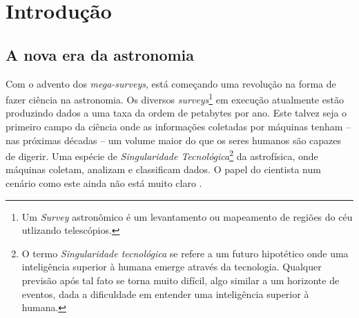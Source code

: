 


\chapter{Introdução}
\label{sec:Intro}


\section{A nova era da astronomia}
\label{sec:Intro:NovaEra}

Com o advento dos {\em mega-surveys}, está começando uma revolução na forma de
fazer ciência na astronomia. Os diversos {\em surveys}\footnote{Um {\em Survey}
astronômico é um levantamento ou mapeamento de regiões do céu utlizando
telescópios.} em execução atualmente estão produzindo dados a uma taxa da ordem
de petabytes por ano. Este talvez seja o primeiro campo da ciência onde as
informações coletadas por máquinas tenham -- nas próximas décadas -- um volume
maior do que os seres humanos são capazes de digerir. Uma espécie de {\em
Singularidade Tecnológica}\footnote{O termo {\em Singularidade tecnológica} se
refere a um futuro hipotético onde uma inteligência superior à humana emerge
através da tecnologia. Qualquer previsão após tal fato se torna muito difícil,
algo similar a um horizonte de eventos, dada a dificuldade em entender uma
inteligência superior à humana.} da astrofísica, onde máquinas coletam, analizam
e classificam dados. O papel do cientista num cenário como este ainda não está
muito claro \citep{Norris2010}.

